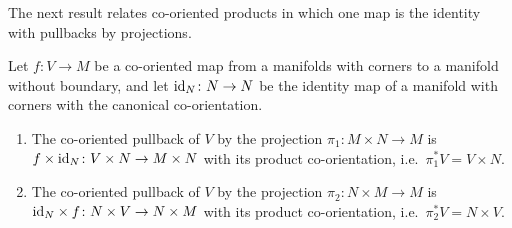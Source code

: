 The next result relates co-oriented products in which one map is the identity with pullbacks by projections.

\begin{proposition}\label{P: projection pullbacks}
	Let $f \colon V \to M$ be a co-oriented map from a manifolds with corners to a manifold without boundary, and let $\mathrm{id}_N \colon N \to N$ be the identity map of a manifold with corners with the canonical co-orientation.
	\begin{enumerate}
		\item The co-oriented pullback of $V$ by the projection $\pi_1 \colon M \times N \to M$ is $f \times \mathrm{id}_N \colon V \times N \to M \times N$ with its product co-orientation, i.e.\ $\pi_1^*V = V \times N$.
		\item The co-oriented pullback of $V$ by the projection $\pi_2 \colon N \times M \to M$ is $\mathrm{id}_N \times f \colon N \times V \to N \times M$ with its product co-orientation, i.e.\ $\pi_2^*V = N \times V$.
	\end{enumerate}
\end{proposition}


